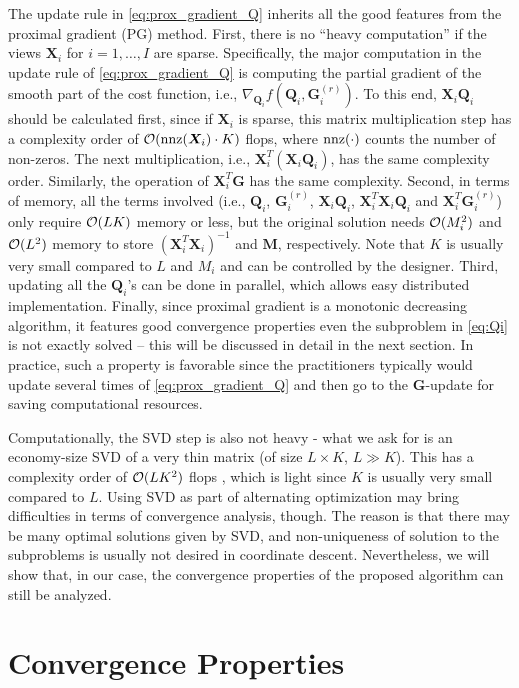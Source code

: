 \documentclass[10pt,journal]{IEEEtran}
\newcommand{\G}{\boldsymbol{G}}
\newcommand{\Q}{\boldsymbol{Q}}
\newcommand{\X}{\boldsymbol{X}}
\begin{document}
The update rule in \eqref{eq:prox_gradient_Q} inherits all the good features from
the proximal gradient (PG) method.
First, there is no ``heavy computation'' if the views $\X_i$ for $i=1,\ldots,I$ are sparse. Specifically, the major computation in the update rule of \eqref{eq:prox_gradient_Q} is computing the partial gradient of the smooth part of the cost function, i.e., $\nabla_{\Q_i} f(\Q_i,\G_i^{(r)})$.
To this end, ${\bm X}_i{\bm Q}_i$ should be calculated first, since if ${\bm X}_i$ is sparse,
this matrix multiplication step has a complexity order of ${\cal O}({\rm nnz}({\bm X}_i)\cdot K)$ flops,
where ${\rm nnz}(\cdot)$ counts the number of non-zeros. The next multiplication, i.e., ${\bm X}_i^T({\bm X}_i{\bm Q}_i)$, has the same complexity order.
Similarly, the operation of $\X_i^T\G$ has the same complexity.
Second, in terms of memory, all the terms involved (i.e., ${\bm Q}_i$, ${\bm G}_i^{(r)}$, ${\bm X}_i{\bm Q}_i$, ${\bm X}_i^T{\bm X}_i{\bm Q}_i$ and ${\bm X}_i^T{\bm G}_i^{(r)}$) only require ${\cal O}(LK)$ memory or less,
but the original solution needs ${\cal O}(M_i^2)$ and ${\cal O}(L^2)$ memory to store $({\bm X}_i^T{\bm X}_i)^{-1}$ and ${\bm M}$, respectively. Note that $K$ is usually very small compared to $L$ and $M_i$ and can be controlled by the designer.
Third, updating all the ${\bm Q}_i$'s can be done in parallel, which allows easy distributed implementation.
Finally, since proximal gradient is a monotonic decreasing algorithm, it features good convergence properties even the subproblem in \eqref{eq:Qi} is not exactly solved -- this will be discussed in detail in the next section.
In practice, such a property is favorable since the practitioners typically would update several times of \eqref{eq:prox_gradient_Q} and then go to the $\G$-update for saving computational resources.

Computationally, the SVD step is also not heavy - what we ask for is an economy-size SVD of a very thin matrix (of size $L\times K$, $L\gg K$).
This has a complexity order of ${\cal O}(LK^2)$ flops \cite{GHGolub1996}, which is light since $K$ is usually very small compared to $L$. Using SVD as part of alternating optimization may bring difficulties in terms of convergence analysis, though. The reason is that there may be many optimal solutions given by SVD, and non-uniqueness of solution to the subproblems is usually not desired in coordinate descent. Nevertheless, we will show that, in our case, the convergence properties of the proposed algorithm can still be analyzed.

\section{Convergence Properties}
\end{document}
